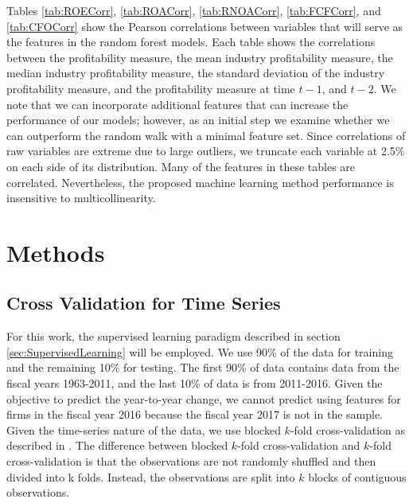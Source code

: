 Tables \ref{tab:ROECorr},  \ref{tab:ROACorr},  \ref{tab:RNOACorr},  \ref{tab:FCFCorr}, and \ref{tab:CFOCorr} show the Pearson correlations between variables that will serve as the features in the random forest models.  Each table shows the correlations between the profitability measure, the mean industry profitability measure, the median industry profitability measure, the standard deviation of the industry profitability measure,  and the profitability measure at time \(t-1\),  and \(t-2\).  We note that we can incorporate additional features that can increase the performance of our models; however, as an initial step we examine whether we can outperform the random walk with a minimal feature set.  Since correlations of raw variables are extreme due to large outliers, we truncate each variable at 2.5\% on each side of its distribution.  Many of the features in these tables are correlated. Nevertheless, the proposed machine learning method performance is insensitive to multicollinearity.   %

\section{Methods}

\subsection{Cross Validation for Time Series} \label{sec:CV-TS}

For this work, the supervised learning paradigm described in section \ref{sec:SupervisedLearning} will be employed.  We use 90\% of the data for training and the remaining 10\% for testing. The first 90\% of data contains data from the fiscal years 1963-2011, and the last 10\% of data is from 2011-2016.  Given the objective to predict the year-to-year change, we cannot predict using features for firms in the fiscal year 2016 because the fiscal year 2017 is not in the sample. Given the time-series nature of the data, we use blocked \(k\)-fold cross-validation as described in \cite{cerqueira2019evaluating}. The difference between blocked \(k\)-fold cross-validation and \(k\)-fold cross-validation is that the observations are not randomly shuffled and then divided into k folds. Instead, the observations are split into \(k\) blocks of contiguous observations. 

